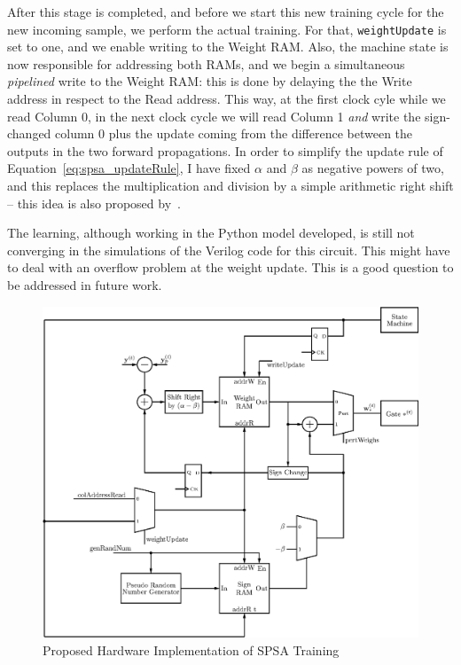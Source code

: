 After this stage is completed, and before we start this new training cycle for the new incoming sample, we perform the actual training. For that, \verb+weightUpdate+ is set to one, and we enable writing to the Weight RAM. Also, the machine state is now responsible for addressing both RAMs, and we begin a simultaneous \emph{pipelined} write to the Weight RAM: this is done by delaying the the Write address in respect to the Read address. This way, at the first clock cyle while we read Column 0, in the next clock cycle we will read Column 1 \emph{and} write the sign-changed column 0 plus the update coming from the difference between the outputs in the two forward propagations. In order to simplify the update rule of Equation~\ref{eq:spsa_updateRule}, I have fixed $\alpha$ and $\beta$ as negative powers of two, and this replaces the multiplication and division by a simple arithmetic right shift -- this idea is also proposed by~\cite{Maeda05}.

The learning, although working in the Python model developed, is still not converging in the simulations of the Verilog code for this circuit. This might have to deal with an overflow problem at the weight update. This is a good question to be addressed in future work.

\begin{figure}
    \centering
    \includegraphics[width=\linewidth]{figures/train.eps}
    \caption[Proposed Hardware Implementation of SPSA Training]{Proposed Hardware Implementation of SPSA Training}
    \label{fig:train}
\end{figure}

